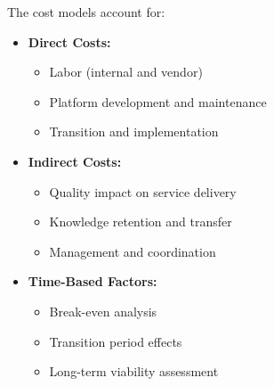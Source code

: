 \documentclass[12pt,a4paper]{article}
\newenvironment{explanation}
{\begin{mdframed}[style=explanationstyle,frametitle={Explanation}]}
{\end{mdframed}}
\begin{document}
\begin{explanation}
The cost models account for:
\begin{itemize}
    \item \textbf{Direct Costs:}
        \begin{itemize}
            \item Labor (internal and vendor)
            \item Platform development and maintenance
            \item Transition and implementation
        \end{itemize}
    \item \textbf{Indirect Costs:}
        \begin{itemize}
            \item Quality impact on service delivery
            \item Knowledge retention and transfer
            \item Management and coordination
        \end{itemize}
    \item \textbf{Time-Based Factors:}
        \begin{itemize}
            \item Break-even analysis
            \item Transition period effects
            \item Long-term viability assessment
        \end{itemize}
\end{itemize}
\end{explanation}
\end{document}
